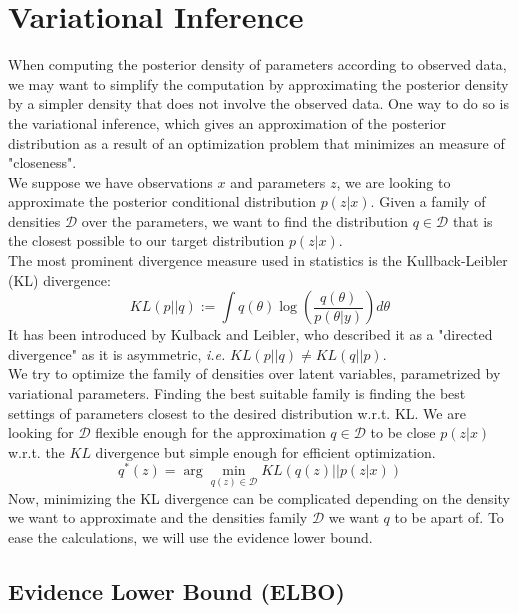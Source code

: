 \section{Variational Inference}
When computing the posterior density of parameters according to observed data, we may want to simplify the computation by approximating the posterior density by a simpler density that does not involve the observed data. One way to do so is the variational inference, which gives an approximation of the posterior distribution as a result of an optimization problem that minimizes an measure of "closeness".\\
\newline
We suppose we have observations $x$ and parameters $z$, we are looking to approximate the posterior conditional distribution $p(z|x)$. Given a family of densities $\mathcal{D}$ over the parameters, we want to find the distribution $q \in \mathcal{D}$ that is the closest possible to our target distribution $p(z|x)$.\\
\newline
The most prominent divergence measure used in statistics is the Kullback-Leibler (KL) divergence:
\begin{equation}
KL(p||q) := \int q(\theta)\log\left(\frac{q(\theta)}{p(\theta|y)}\right) d\theta
\label{eq:KL_div}
\end{equation}
It has been introduced by Kulback and Leibler, who described it as a "directed divergence" as it is asymmetric, \textit{i.e. }$KL(p||q) \neq KL(q||p)$.\\
\newline
We try to optimize the family of densities over latent variables, parametrized by variational parameters. Finding the best suitable family is finding the best settings of parameters closest to the desired distribution w.r.t. KL. We are looking for $\mathcal{D}$ flexible enough for the approximation $q \in \mathcal{D}$ to be close $p(z|x)$ w.r.t. the $KL$ divergence but simple enough for efficient optimization.\\

\begin{equation}
q^*(z) = \arg\min_{q(z) \in \mathcal{D}} KL(q(z)||p(z|x))
\label{eq:best_q}
\end{equation}
Now, minimizing the KL divergence can be complicated depending on the density we want to approximate and the densities family $\mathcal{D}$ we want $q$ to be apart of. To ease the calculations, we will use the evidence lower bound.
\subsection{Evidence Lower Bound (ELBO)}

